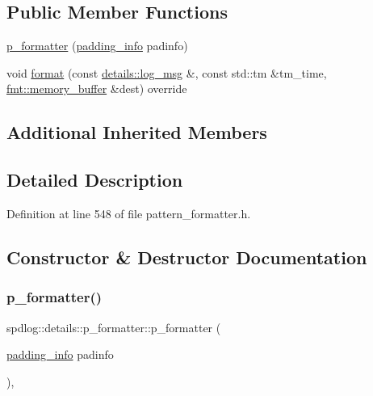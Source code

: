 \subsection*{Public Member Functions}
\begin{DoxyCompactItemize}
\item 
\hyperlink{classspdlog_1_1details_1_1p__formatter_a8a8cea56b038ed4d7f6cd6a04db4a135}{p\+\_\+formatter} (\hyperlink{structspdlog_1_1details_1_1padding__info}{padding\+\_\+info} padinfo)
\item 
void \hyperlink{classspdlog_1_1details_1_1p__formatter_a18faf31df030e289f7166eaa7e6f1af1}{format} (const \hyperlink{structspdlog_1_1details_1_1log__msg}{details\+::log\+\_\+msg} \&, const std\+::tm \&tm\+\_\+time, \hyperlink{format_8h_a21cbf729f69302f578e6db21c5e9e0d2}{fmt\+::memory\+\_\+buffer} \&dest) override
\end{DoxyCompactItemize}
\subsection*{Additional Inherited Members}


\subsection{Detailed Description}


Definition at line 548 of file pattern\+\_\+formatter.\+h.



\subsection{Constructor \& Destructor Documentation}
\mbox{\label{classspdlog_1_1details_1_1p__formatter_a8a8cea56b038ed4d7f6cd6a04db4a135}} 
\subsubsection{\texorpdfstring{p\+\_\+formatter()}{p\_formatter()}}
{\footnotesize\ttfamily spdlog\+::details\+::p\+\_\+formatter\+::p\+\_\+formatter (\begin{DoxyParamCaption}\item[{\hyperlink{structspdlog_1_1details_1_1padding__info}{padding\+\_\+info}}]{padinfo }\end{DoxyParamCaption})\hspace{0.3cm}{\ttfamily [inline]}, {\ttfamily [explicit]}}



